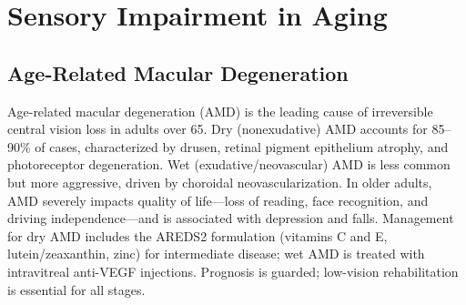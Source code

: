 \section{Sensory Impairment in Aging}








\label{sec:Sensory Impairment in Aging}

\subsection{Age-Related Macular Degeneration}
\label{sec:geriatric:Age-Related Macular Degeneration}
Age-related macular degeneration (AMD) is the leading cause of irreversible central vision loss in adults over 65. Dry (nonexudative) AMD accounts for 85--90\% of cases, characterized by drusen, retinal pigment epithelium atrophy, and photoreceptor degeneration. Wet (exudative/neovascular) AMD is less common but more aggressive, driven by choroidal neovascularization. In older adults, AMD severely impacts quality of life---loss of reading, face recognition, and driving independence---and is associated with depression and falls. Management for dry AMD includes the AREDS2 formulation (vitamins C and E, lutein/zeaxanthin, zinc) for intermediate disease; wet AMD is treated with intravitreal anti-VEGF injections. Prognosis is guarded; low-vision rehabilitation is essential for all stages.

